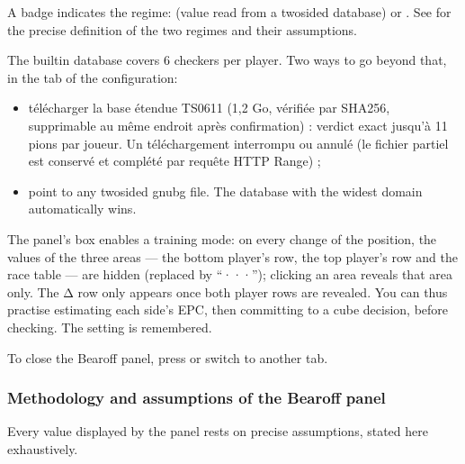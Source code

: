 \documentclass[letterpaper,10pt,english]{sphinxmanual}
\begin{document}
\sphinxAtStartPar
A badge indicates the regime:  (value read from a two\sphinxhyphen{}sided database) or . See {\hyperref[\detokenize{manuel:epc-methodologie}]{}} for the precise definition of the two regimes and their assumptions.

\sphinxAtStartPar
{} The built\sphinxhyphen{}in database covers 6 checkers per player. Two ways to go beyond that, in the  tab of the configuration:
\begin{itemize}
\item {} 
\sphinxAtStartPar
télécharger la base étendue TS\sphinxhyphen{}06\sphinxhyphen{}11 (1,2 Go, vérifiée par SHA\sphinxhyphen{}256,
supprimable au même endroit après confirmation) : verdict exact jusqu’à
11 pions par joueur. Un téléchargement interrompu ou annulé  (le fichier partiel est conservé et complété par
requête HTTP Range) ;

\item {} 
\sphinxAtStartPar
point to any two\sphinxhyphen{}sided gnubg  file. The database with the widest domain automatically wins.

\end{itemize}

\sphinxAtStartPar
{} The panel’s  box enables a training mode: on every change of the position, the values of the three areas — the bottom player’s row, the top player’s row and the race table — are hidden (replaced by “···”); clicking an area reveals that area only. The Δ row only appears once both player rows are revealed. You can thus practise estimating each side’s EPC, then committing to a cube decision, before checking. The setting is remembered.

\sphinxAtStartPar
To close the Bearoff panel, press  or switch to another tab.


\subsubsection{Methodology and assumptions of the Bearoff panel}
\label{\detokenize{manuel:methodologie-et-hypotheses-du-panneau-bearoff}}\label{\detokenize{manuel:epc-methodologie}}
\sphinxAtStartPar
Every value displayed by the panel rests on precise assumptions, stated here exhaustively.
\end{document}

